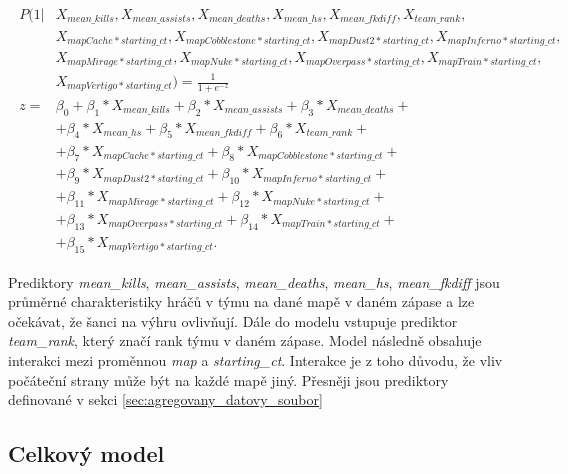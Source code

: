 \begin{align}
    \begin{split}
        P(1 | &X_{mean\_kills}, X_{mean\_assists}, X_{mean\_deaths}, X_{mean\_hs}, X_{mean\_fkdiff}, X_{team\_rank}, \\
              &X_{mapCache*starting\_ct}, X_{mapCobblestone*starting\_ct}, X_{mapDust2*starting\_ct}, X_{mapInferno*starting\_ct}, \\
              &X_{mapMirage*starting\_ct}, X_{mapNuke*starting\_ct}, X_{mapOverpass*starting\_ct}, X_{mapTrain*starting\_ct}, \\
              &X_{mapVertigo*starting\_ct}) = \frac{1}{1 + e^{-z}} \\
        z = &\beta_0 + \beta_1*X_{mean\_kills} + \beta_2*X_{mean\_assists} + \beta_3*X_{mean\_deaths} + \\
            &+ \beta_4*X_{mean\_hs} + \beta_5*X_{mean\_fkdiff} + \beta_6*X_{team\_rank} + \\
            &+ \beta_7*X_{mapCache*starting\_ct} + \beta_8*X_{mapCobblestone*starting\_ct} + \\
            &+ \beta_9*X_{mapDust2*starting\_ct} +\beta_{10}*X_{mapInferno*starting\_ct} + \\
            &+ \beta_{11}*X_{mapMirage*starting\_ct} + \beta_{12}*X_{mapNuke*starting\_ct} + \\
            &+ \beta_{13}*X_{mapOverpass*starting\_ct} + \beta_{14}*X_{mapTrain*starting\_ct} + \\
            &+ \beta_{15}*X_{mapVertigo*starting\_ct}.
    \end{split}
\end{align}

Prediktory \textit{mean\_kills}, \textit{mean\_assists}, \textit{mean\_deaths}, \textit{mean\_hs}, \textit{mean\_fkdiff} jsou průměrné charakteristiky hráčů v týmu na dané mapě
v daném zápase a lze očekávat, že šanci na výhru ovlivňují. Dále do modelu vstupuje prediktor \textit{team\_rank}, který značí rank týmu v daném zápase. Model následně
obsahuje interakci mezi proměnnou \textit{map} a \textit{starting\_ct}. Interakce je z toho důvodu, že vliv počáteční strany může být na každé mapě jiný. Přesněji jsou prediktory
definované v sekci \ref{sec:agregovany_datovy_soubor}

\subsection{Celkový model}

